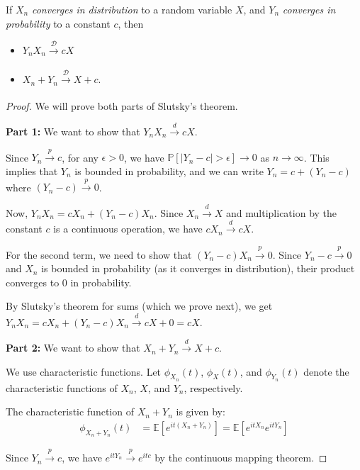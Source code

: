 \begin{theorem}
    If $X_n$ \textit{converges in distribution} to a random variable $X$, and $Y_n$ \textit{converges in probability} to a constant $c$, then 
    \begin{itemize}
        \item[$\bullet$] $Y_nX_n \xrightarrow[]{\mathcal{D}} cX$
        \item[$\bullet$] $X_n + Y_n \xrightarrow[]{\mathcal{D}} X + c$.
    \end{itemize}
\end{theorem}

\begin{proof}
    We will prove both parts of Slutsky's theorem.
    
    \textbf{Part 1:} We want to show that $Y_nX_n \xrightarrow{d} cX$.
    
    Since $Y_n \xrightarrow{p} c$, for any $\epsilon > 0$, we have $\mathbb{P}[|Y_n - c| > \epsilon] \to 0$ as $n \to \infty$.
    This implies that $Y_n$ is bounded in probability, and we can write $Y_n = c + (Y_n - c)$ where $(Y_n - c) \xrightarrow{p} 0$.
    
    Now, $Y_nX_n = cX_n + (Y_n - c)X_n$. Since $X_n \xrightarrow{d} X$ and multiplication by the constant $c$ is a continuous operation, we have $cX_n \xrightarrow{d} cX$.
    
    For the second term, we need to show that $(Y_n - c)X_n \xrightarrow{p} 0$. Since $Y_n - c \xrightarrow{p} 0$ and $X_n$ is bounded in probability (as it converges in distribution), their product converges to 0 in probability.
    
    By Slutsky's theorem for sums (which we prove next), we get $Y_nX_n = cX_n + (Y_n - c)X_n \xrightarrow{d} cX + 0 = cX$.
    
    \textbf{Part 2:} We want to show that $X_n + Y_n \xrightarrow{d} X + c$.
    
    We use characteristic functions. Let $\phi_{X_n}(t)$, $\phi_X(t)$, and $\phi_{Y_n}(t)$ denote the characteristic functions of $X_n$, $X$, and $Y_n$, respectively.
    
    The characteristic function of $X_n + Y_n$ is given by:
    \begin{align*}
        \phi_{X_n + Y_n}(t) &= \mathbb{E}[e^{it(X_n + Y_n)}] = \mathbb{E}[e^{itX_n}e^{itY_n}]
    \end{align*}
    
    Since $Y_n \xrightarrow{p} c$, we have $e^{itY_n} \xrightarrow{p} e^{itc}$ by the continuous mapping theorem.
    

\end{proof}
